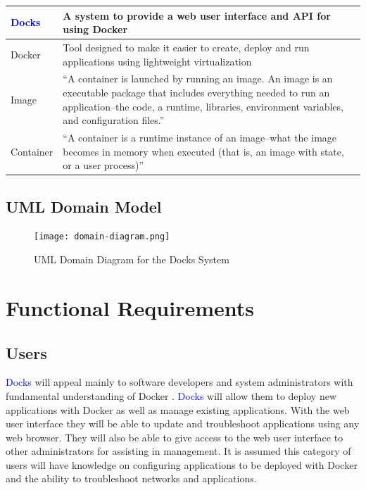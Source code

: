 \documentclass[]{article}
\newcommand{\docks}{\textcolor{Blue}{Docks} }
\newcommand{\docker}{Docker }
\begin{document}
\begin{table}[H]
	\begin{tabular}{|p{2cm}|p{10cm}|}
		\hline
		\docks &  A system to provide a web user interface and API for using \docker \\ \hline

		\docker & Tool designed to make it easier to create, deploy and run applications
		using lightweight virtualization \\ \hline

		Image & ``A container is launched by running an image.
		An image is an executable package that includes everything
		needed to run an application--the code, a runtime, libraries,
		environment variables, and configuration files.'' \\ \hline

		Container & ``A container is a runtime instance 
		of an image--what the image becomes in memory when 
		executed (that is, an image with state, or a user process)'' \\ \hline

	\end{tabular}
\end{table}

\subsection{UML Domain Model}

\begin{figure}[H]
	\centering
	\texttt{[image: domain-diagram.png]}
	\caption{UML Domain Diagram for the Docks System}
\end{figure}

\section{Functional Requirements}

\subsection{Users}
\docks will appeal mainly to software developers and system administrators
with fundamental understanding of \docker. \docks will allow
them to deploy new applications with \docker as well as manage existing 
applications. With the web user interface they will be able to
update and troubleshoot applications using any web browser. They will
also be able to give access to the web user interface to other administrators
for assisting in management. It is assumed this category of users will
have knowledge on configuring applications to be deployed with \docker
and the ability to troubleshoot networks and applications.
\end{document}
